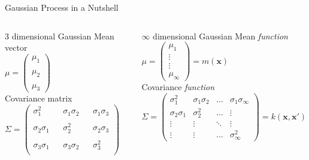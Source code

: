 \documentclass[pdf]{beamer}
\begin{document}
\begin{frame}{Gaussian Process in a Nutshell}
\small
\begin{columns}
\begin{block}{3 dimensional Gaussian}
Mean vector
\\[0.2cm]
$\mu = 
\begin{pmatrix}
\mu_1 \\ \\ \mu_2 \\ \\ \mu_3
\end{pmatrix}
$
\\[0.6cm]
Covariance matrix
\\[0.4cm]
$\Sigma = 
\begin{pmatrix}
  	\sigma^2_1 & & \sigma_1\sigma_2 & & \sigma_1\sigma_3\\
  	& & & & \\	
  	\sigma_2\sigma_1 & & \sigma^2_2 & & \sigma_2\sigma_3 \\
	& & & & \\
	\sigma_3\sigma_1 & & \sigma_3\sigma_2 & & \sigma^2_3 \\
\end{pmatrix}
$
\end{block}

\begin{block}{$\infty$ dimensional Gaussian}
Mean \textit{function}
\\[0.2cm]
$\mu = 
\begin{pmatrix}
\mu_1 \\ \vdots \\ \vdots \\ \mu_\infty
\end{pmatrix}
= m(\mathbf{x})
$
\\[0.5cm]
Covariance \textit{function}
\\[0.2cm]
$\Sigma = 
\begin{pmatrix}
  	\sigma^2_1 		& \sigma_1\sigma_2  & \hdots & \sigma_1\sigma_\infty\\
  	\sigma_2\sigma_1& \sigma^2_2 		& \hdots & \vdots \\
	\vdots 			& \vdots 			& \ddots & \vdots \\
	\vdots 			& \vdots 			& \hdots & \sigma^2_\infty
\end{pmatrix}
= k(\mathbf{x},\mathbf{x}')
$
\end{block}

\end{columns}

\end{frame}
\end{document}
